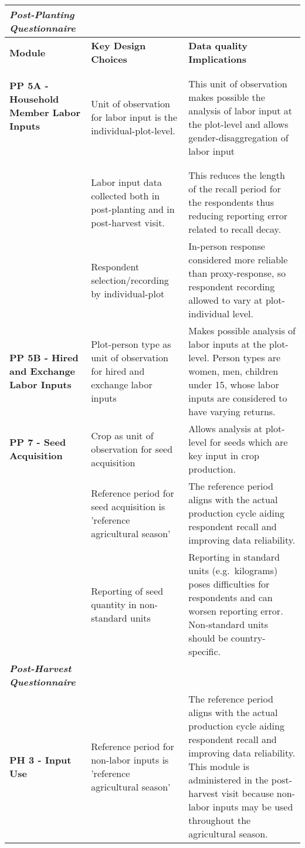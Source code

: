 \documentclass[
]{book}
\begin{document}
\begin{longtable}[]{@{}
  >{\raggedright\arraybackslash}p{}
  >{\raggedright\arraybackslash}p{}
  >{\raggedright\arraybackslash}p{}@{}}
\toprule
\textbf{\emph{Post-Planting Questionnaire}} & & \\
\midrule
\endhead
\textbf{Module} & \textbf{Key Design Choices} & \textbf{Data quality Implications} \\
\textbf{PP 5A - Household Member Labor Inputs}

\textbf{~} & Unit of observation for labor input is the individual-plot-level. & This unit of observation makes possible the analysis of labor input at the plot-level and allows gender-disaggregation of labor input \\
& Labor input data collected both in post-planting and in post-harvest visit. & This reduces the length of the recall period for the respondents thus reducing reporting error related to recall decay. \\
& Respondent selection/recording by individual-plot & In-person response considered more reliable than proxy-response, so respondent recording allowed to vary at plot-individual level. \\
\textbf{PP 5B - Hired and Exchange Labor Inputs} & Plot-person type as unit of observation for hired and exchange labor inputs & Makes possible analysis of labor inputs at the plot-level. Person types are women, men, children under 15, whose labor inputs are considered to have varying returns. \\
\textbf{PP 7 - Seed Acquisition} & Crop as unit of observation for seed acquisition & Allows analysis at plot-level for seeds which are key input in crop production. \\
& Reference period for seed acquisition is 'reference agricultural season' & The reference period aligns with the actual production cycle aiding respondent recall and improving data reliability. \\
& Reporting of seed quantity in non-standard units & Reporting in standard units (e.g.~kilograms) poses difficulties for respondents and can worsen reporting error. Non-standard units should be country-specific. \\
\textbf{\emph{Post-Harvest Questionnaire}} & & \\
\textbf{PH 3 - Input Use} & Reference period for non-labor inputs is 'reference agricultural season' & The reference period aligns with the actual production cycle aiding respondent recall and improving data reliability. This module is administered in the post-harvest visit because non-labor inputs may be used throughout the agricultural season. \\

\end{longtable}
\end{document}
